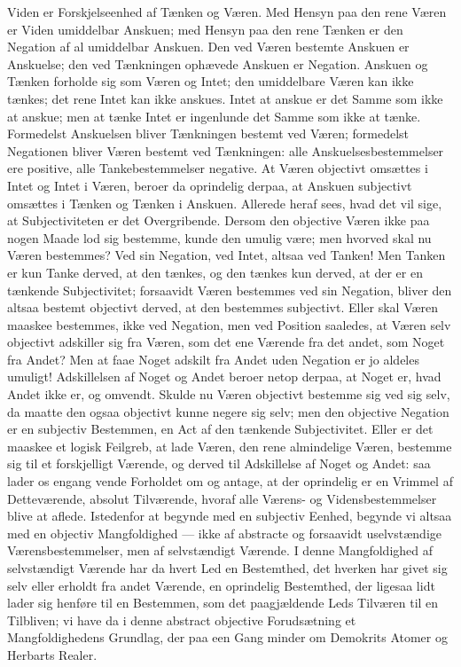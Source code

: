 \documentclass[12pt]{book}
\newcommand{\opage}[1]{\marginnote{\footnotesize\textit{[#1]}}}
\begin{document}
Viden er Forskjelseenhed af Tænken og Væren. Med Hensyn paa den rene Væren er Viden
umiddelbar Anskuen; med Hensyn paa den rene Tænken er den Negation af al umiddelbar
Anskuen. Den ved Væren bestemte Anskuen er Anskuelse; den ved Tænkningen ophævede
Anskuen er Negation. Anskuen og Tænken forholde sig som Væren og Intet; den
umiddelbare Væren kan ikke tænkes; det rene Intet kan ikke anskues. Intet at anskue
er det Samme som ikke at anskue; men at tænke Intet er ingenlunde det Samme som ikke
at tænke. Formedelst Anskuelsen bliver Tænkningen bestemt ved Væren; formedelst
Negationen bliver Væren bestemt ved Tænkningen: alle Anskuelsesbestemmelser ere
positive, alle Tankebestemmelser negative. At Væren objectivt omsættes i Intet og
Intet i Væren, beroer da oprindelig derpaa, at Anskuen subjectivt omsættes i Tænken
og Tænken i Anskuen. Allerede heraf sees, hvad det vil sige, at Subjectiviteten er det
Overgribende. Dersom den objective Væren ikke paa nogen Maade lod sig bestemme, kunde
den umulig være; men hvorved skal nu Væren bestemmes? Ved sin Negation, ved Intet,
altsaa ved Tanken! Men Tanken er kun Tanke derved, at den tænkes, og den tænkes kun
derved, at der er en tænkende Subjectivitet; forsaavidt Væren bestemmes ved sin
Negation, bliver den altsaa bestemt objectivt derved, at den bestemmes subjectivt.
Eller skal Væren maaskee bestemmes, ikke ved Negation, men ved Position saaledes, at
Væren selv objectivt adskiller sig fra Væren, som det ene Værende fra det andet, som
Noget fra Andet? Men at faae Noget adskilt fra Andet uden Negation er jo aldeles
umuligt! Adskillelsen af Noget og Andet beroer netop derpaa, at Noget er, hvad Andet
ikke er, og omvendt. Skulde nu Væren objectivt bestemme sig ved sig selv, da maatte
den ogsaa objectivt kunne negere sig
\opage{13} selv; men den objective Negation er en subjectiv Bestemmen, en Act af den tænkende
Subjectivitet. Eller er det maaskee et logisk Feilgreb, at lade Væren, den rene
almindelige Væren, bestemme sig til et forskjelligt Værende, og derved til
Adskillelse af Noget og Andet: saa lader os engang vende Forholdet om og antage, at
der oprindelig er en Vrimmel af Detteværende, absolut Tilværende, hvoraf alle Værens-
og Vidensbestemmelser blive at aflede. Istedenfor at begynde med en subjectiv Eenhed,
begynde vi altsaa med en objectiv Mangfoldighed --- ikke af abstracte og forsaavidt
uselvstændige Værensbestemmelser, men af selvstændigt Værende. I denne Mangfoldighed
af selvstændigt Værende har da hvert Led en Bestemthed, det hverken har givet sig
selv eller erholdt fra andet Værende, en oprindelig Bestemthed, der ligesaa lidt
lader sig henføre til en Bestemmen, som det paagjældende Leds Tilværen til en
Tilbliven; vi have da i denne abstract objective Forudsætning et Mangfoldighedens
Grundlag, der paa een Gang minder om Demokrits Atomer og Herbarts Realer.
\end{document}
